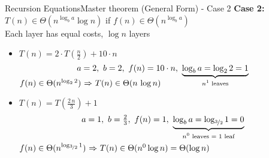 \begin{frame}{Recursion Equations}{Master theorem (General Form) - Case 2}
  \textbf{Case 2:}
  {\color{Mittel-Gruen}$T(n) \in \Theta(n^{\log_b a} \log n)$}
  \hspace{1.5em} if {\color{Mittel-Blau}
    $f(n) \in \Theta(n^{\log_b a})$
  }\\
  {\color{gray}Each layer has equal costs, $\log n$ layers}
  \vspace{1.0em}
  \begin{itemize}
    \item
      $T(n) = 2 \cdot T(\tfrac{n}{2}) + 10 \cdot n$
      \vspace{-0.5em}
      \begin{displaymath}
        a = 2, ~ b = 2, ~ f(n) = 10 \cdot n, ~
        \smash{\underbrace{
          \log_b a = \log_2 2 = 1
        }_{\text{$n^1$ leaves}}}
      \end{displaymath}
      {\color{Mittel-Blau}\begin{math}
        f(n) \in \Theta(n^{\log_2 2})$
        $\Rightarrow$
        $T(n) \in \Theta(n \, \log n)
      \end{math}}
      \vspace{1.0em}
    \item
      $T(n) = T(\tfrac{2\,n}{3}) + 1$
      \vspace{-0.5em}
      \begin{displaymath}
        a = 1, ~ b = \tfrac{2}{3}, ~ f(n) = 1, ~
        \smash{\underbrace{
          \log_b a = \log_{\nicefrac{3}{2}} 1 = 0
        }_{\text{$n^0$ leaves $=$ 1 leaf}}}
      \end{displaymath}
      \hfill\\[1.0em]
      {\color{Mittel-Blau}\begin{math}
        f(n) \in \Theta(n^{\log_{\nicefrac{3}{2}} 1})$
        $\Rightarrow$
        $T(n) \in \Theta(n^0 \log n) = \Theta(\log n)
      \end{math}}
  \end{itemize}
\end{frame}


